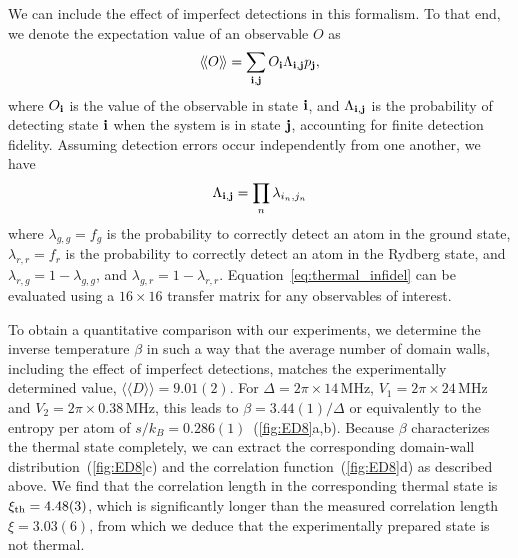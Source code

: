 \documentclass[prl,nobalancelastpage,twocolumn,superscriptaddress,nofootinbib]{revtex4}
\newcommand{\meanmean}[1]{\langle\!\langle #1 \rangle\!\rangle}
\begin{document}
\begin{footnotesize}
We can include the effect of imperfect detections in this formalism. To that
end, we denote the expectation value of an observable $O$ as
\begin{align}\label{eq:thermal_infidel}
    \meanmean{O}=\sum_{{\bf i},{\bf j}} O_{\bf i} \Lambda_{{\bf i},{\bf j}} p_{\bf j},
\end{align}
where $O_{\bf i}$ is the value of the observable in state ${\bf i}$, and
$\Lambda_{{\bf i},{\bf j}}$ is the probability of detecting state ${\bf i}$ when
the system is in state ${\bf j}$, accounting for finite detection fidelity.
Assuming detection errors occur independently from one another, we have
\begin{equation*}
\Lambda_{{\bf i},{\bf j}}=\prod_n \lambda_{i_n,j_n}
\end{equation*}
where $\lambda_{g,g}=f_g$ is the probability to correctly detect an atom in the
ground state, $\lambda_{r,r}=f_r$ is the probability to correctly detect an
atom in the Rydberg state, and $\lambda_{r,g}=1-\lambda_{g,g}$, and
$\lambda_{g,r}=1-\lambda_{r,r}$. Equation~\eqref{eq:thermal_infidel} can be
evaluated using a $16\times 16$ transfer matrix for any observables of
interest.

To obtain a quantitative comparison with our experiments, we determine the
inverse temperature $\beta$ in such a way that the average number of domain
walls, including the effect of imperfect detections, matches the
experimentally determined value, $\meanmean{D}=9.01(2)$. For
$\Delta=2\pi\times 14\,$MHz, $V_1=2\pi\times 24\,$MHz and $V_2=2\pi\times
0.38\,$MHz, this leads to $\beta=3.44(1)/\Delta$ or equivalently to the entropy
per atom of $s/k_B=0.286(1)$~(\ref{fig:ED8}a,b). Because $\beta$ characterizes
the thermal state completely, we can extract the corresponding domain-wall
distribution~(\ref{fig:ED8}c) and the correlation function~(\ref{fig:ED8}d) as
described above. We find that the correlation length in the corresponding
thermal state is  $\xi_{\rm th}= 4.48(3)$, which is significantly longer than
the measured correlation length $\xi=3.03(6)$, from which we deduce that the
experimentally prepared state is not thermal.


\end{footnotesize}
\end{document}
